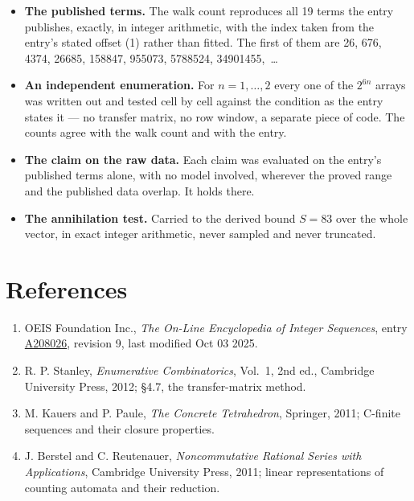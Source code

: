 \documentclass[11pt]{article}
\theoremstyle{definition}
\begin{document}
\begin{itemize}

\item {\bfseries The published terms.} The walk count reproduces all 19 terms the entry publishes, exactly, in integer arithmetic, with the index taken from the entry's stated offset (1) rather than fitted. The first of them are 26, 676, 4374, 26685, 158847, 955073, 5788524, 34901455,~\dots

\item {\bfseries An independent enumeration.} For $n = 1,\dots,2$ every one of the $2^{6n}$ arrays was written out and tested cell by cell against the condition as the entry states it --- no transfer matrix, no row window, a separate piece of code. The counts agree with the walk count and with the entry.

\item {\bfseries The claim on the raw data.} Each claim was evaluated on the entry's published terms alone, with no model involved, wherever the proved range and the published data overlap. It holds there.

\item {\bfseries The annihilation test.} Carried to the derived bound $S = 83$ over the whole vector, in exact integer arithmetic, never sampled and never truncated.

\end{itemize}

\section{References}

\begin{enumerate}

\item OEIS Foundation Inc., \emph{The On-Line Encyclopedia of Integer Sequences}, entry \href{https://oeis.org/A208026}{A208026}, revision 9, last modified Oct 03 2025.

\item R. P. Stanley, \emph{Enumerative Combinatorics}, Vol.~1, 2nd ed., Cambridge University Press, 2012; \S4.7, the transfer-matrix method.

\item M. Kauers and P. Paule, \emph{The Concrete Tetrahedron}, Springer, 2011; C-finite sequences and their closure properties.

\item J. Berstel and C. Reutenauer, \emph{Noncommutative Rational Series with Applications}, Cambridge University Press, 2011; linear representations of counting automata and their reduction.

\end{enumerate}
\end{document}
